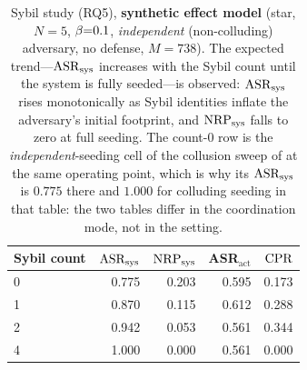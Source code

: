 \begin{table}[t]
\centering
\caption{Sybil study (RQ5), \textbf{synthetic effect model} (star, $N{=}5$,
$\beta{=}0.1$, \emph{independent} (non-colluding) adversary, no defense, $M{=}738$). The
expected trend---$\mathrm{ASR}_{\mathrm{sys}}$ increases with the Sybil count until the system is fully
seeded---is observed: $\mathrm{ASR}_{\mathrm{sys}}$ rises monotonically as Sybil identities inflate the
adversary's initial footprint, and $\mathrm{NRP}_{\mathrm{sys}}$ falls to zero at full seeding. The count-$0$ row
is the \emph{independent}-seeding cell of the collusion sweep of  at the
same operating point, which is why its $\mathrm{ASR}_{\mathrm{sys}}$ is $0.775$ there and $1.000$ for colluding
seeding in that table: the two tables differ in the coordination mode, not in the setting.}
\label{tab:sybil}
\small
\renewcommand{\arraystretch}{1.08}
\setlength{\tabcolsep}{4pt}
\begin{tabular}{@{}lrrrr@{}}
\toprule
Sybil count & $\mathrm{ASR}_{\mathrm{sys}}$ & $\mathrm{NRP}_{\mathrm{sys}}$ & ASR$_{\mathrm{act}}$ & $\mathrm{CPR}$ \\
\midrule
0 & 0.775 & 0.203 & 0.595 & 0.173 \\
1 & 0.870 & 0.115 & 0.612 & 0.288 \\
2 & 0.942 & 0.053 & 0.561 & 0.344 \\
4 & 1.000 & 0.000 & 0.561 & 0.000 \\
\bottomrule
\end{tabular}
\end{table}

